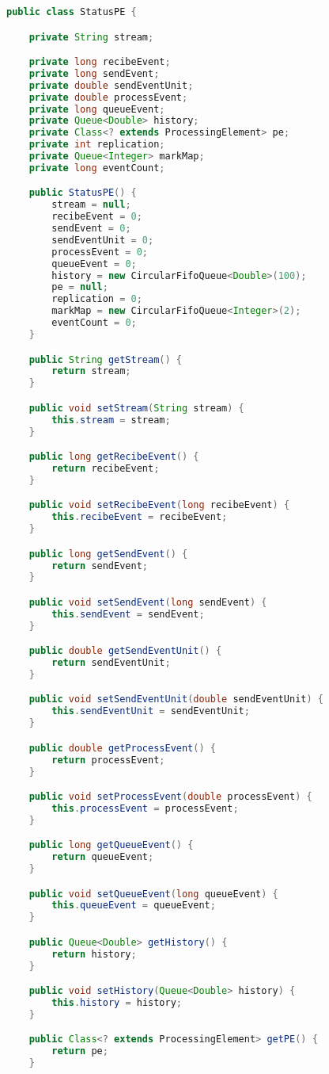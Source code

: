 \begin{lstlisting}[caption={Clase StatusPE, el cual contiene las estad\'isticas de un PE espec\'ifico.},label={lst:statusPE},language=Java]
public class StatusPE {

	private String stream;

	private long recibeEvent;
	private long sendEvent;
	private double sendEventUnit;
	private double processEvent;
	private long queueEvent;
	private Queue<Double> history;
	private Class<? extends ProcessingElement> pe;
	private int replication;
	private Queue<Integer> markMap;
	private long eventCount;

	public StatusPE() {
		stream = null;
		recibeEvent = 0;
		sendEvent = 0;
		sendEventUnit = 0;
		processEvent = 0;
		queueEvent = 0;
		history = new CircularFifoQueue<Double>(100);
		pe = null;
		replication = 0;
		markMap = new CircularFifoQueue<Integer>(2);
		eventCount = 0;
	}

	public String getStream() {
		return stream;
	}

	public void setStream(String stream) {
		this.stream = stream;
	}

	public long getRecibeEvent() {
		return recibeEvent;
	}

	public void setRecibeEvent(long recibeEvent) {
		this.recibeEvent = recibeEvent;
	}

	public long getSendEvent() {
		return sendEvent;
	}

	public void setSendEvent(long sendEvent) {
		this.sendEvent = sendEvent;
	}

	public double getSendEventUnit() {
		return sendEventUnit;
	}

	public void setSendEventUnit(double sendEventUnit) {
		this.sendEventUnit = sendEventUnit;
	}

	public double getProcessEvent() {
		return processEvent;
	}

	public void setProcessEvent(double processEvent) {
		this.processEvent = processEvent;
	}

	public long getQueueEvent() {
		return queueEvent;
	}

	public void setQueueEvent(long queueEvent) {
		this.queueEvent = queueEvent;
	}

	public Queue<Double> getHistory() {
		return history;
	}

	public void setHistory(Queue<Double> history) {
		this.history = history;
	}

	public Class<? extends ProcessingElement> getPE() {
		return pe;
	}


\end{lstlisting}
